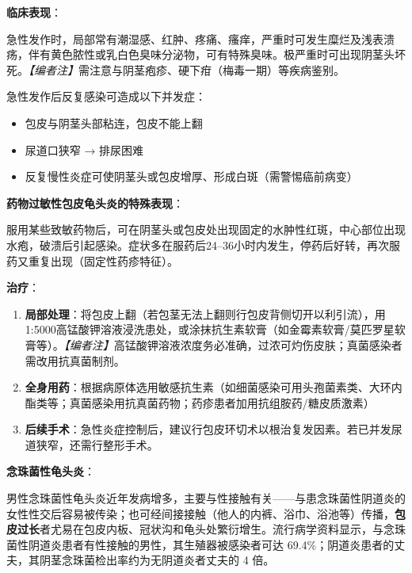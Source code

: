 \documentclass[12pt,a4paper,twoside]{ctexbook}
\begin{document}
\vspace{0.5em}
\noindent\textbf{临床表现}：

急性发作时，局部常有潮湿感、红肿、疼痛、瘙痒，严重时可发生糜烂及浅表溃疡，伴有黄色脓性或乳白色臭味分泌物，可有特殊臭味。极严重时可出现阴茎头坏死。\textit{【编者注】}需注意与阴茎疱疹、硬下疳（梅毒一期）等疾病鉴别。

急性发作后反复感染可造成以下并发症：
\begin{itemize}
	\item 包皮与阴茎头部粘连，包皮不能上翻
	\item 尿道口狭窄 → 排尿困难
	\item 反复慢性炎症可使阴茎头或包皮增厚、形成白斑（需警惕癌前病变）
\end{itemize}

\vspace{0.5em}
\noindent\textbf{药物过敏性包皮龟头炎的特殊表现}：

服用某些致敏药物后，可在阴茎头或包皮处出现固定的水肿性红斑，中心部位出现水疱，破溃后引起感染。症状多在服药后24--36小时内发生，停药后好转，再次服药又重复出现（固定性药疹特征）。

\vspace{0.5em}
\noindent\textbf{治疗}：
\begin{enumerate}
	\item \textbf{局部处理}：将包皮上翻（若包茎无法上翻则行包皮背侧切开以利引流），用1:5000高锰酸钾溶液浸洗患处，或涂抹抗生素软膏（如金霉素软膏/莫匹罗星软膏等）。\textit{【编者注】}高锰酸钾溶液浓度务必准确，过浓可灼伤皮肤；真菌感染者需改用抗真菌制剂。
	\item \textbf{全身用药}：根据病原体选用敏感抗生素（如细菌感染可用头孢菌素类、大环内酯类等；真菌感染用抗真菌药物；药疹患者加用抗组胺药/糖皮质激素）
	\item \textbf{后续手术}：急性炎症控制后，建议行包皮环切术以根治复发因素。若已并发尿道狭窄，还需行整形手术。
\end{enumerate}

\vspace{0.5em}
\noindent\textbf{念珠菌性龟头炎}：

男性念珠菌性龟头炎近年发病增多，主要与性接触有关——与患念珠菌性阴道炎的女性性交后容易被传染；也可经间接接触（他人的内裤、浴巾、浴池等）传播，\textbf{包皮过长}者尤易在包皮内板、冠状沟和龟头处繁衍增生。流行病学资料显示，与念珠菌性阴道炎患者有性接触的男性，其生殖器被感染者可达 69.4\%；阴道炎患者的丈夫，其阴茎念珠菌检出率约为无阴道炎者丈夫的 4 倍。
\end{document}
